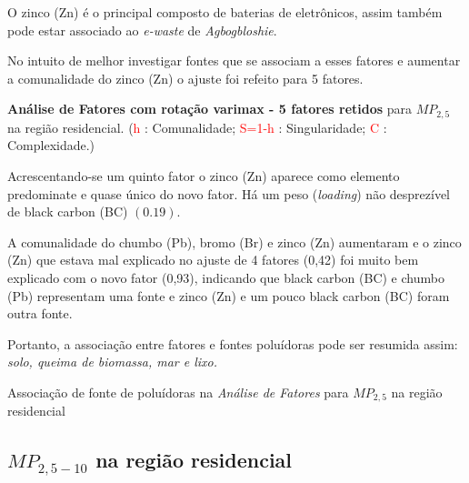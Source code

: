 O zinco (Zn) é o principal composto de baterias de eletrônicos, assim também 
pode estar associado ao \textit{e-waste} de \textit{Agbogbloshie}.

No intuito de melhor investigar fontes que se associam a esses fatores e aumentar
a comunalidade do zinco (Zn) o ajuste foi refeito para 5 fatores.


\begin{table}[H]
  \caption{\textbf{Análise de Fatores com rotação varimax - 5 fatores retidos} 
            para $MP_{2,5}$ na região residencial.
           (\textcolor{red}{h} : Comunalidade; 
           \textcolor{red}{S=1-h} : Singularidade; 
           \textcolor{red}{C} : Complexidade.)}
  
\end{table}

Acrescentando-se um quinto fator o zinco (Zn) aparece como elemento predominate 
e quase único do novo fator. Há um peso (\textit{loading}) não desprezível de 
black carbon (BC) $(0.19)$. 

A comunalidade do chumbo (Pb), bromo (Br) e zinco (Zn) aumentaram e o zinco (Zn)
que estava mal explicado no ajuste de 4 fatores (0,42) foi muito bem explicado
com o novo fator (0,93), indicando que black carbon (BC) e chumbo (Pb) representam 
uma fonte e zinco (Zn) e um pouco black carbon (BC) foram outra fonte.  

Portanto, a associação entre fatores e fontes poluídoras pode ser resumida
assim: \textit{solo, queima de biomassa, mar e lixo.}

\begin{table}[H]
  \centering
  \caption{Associação de fonte de poluídoras na \textit{Análise de Fatores}
         para $MP_{2,5}$ na região residencial}
  
\end{table}

\subsection{$MP_{2,5-10}$ na região residencial}


%
%
%
%
